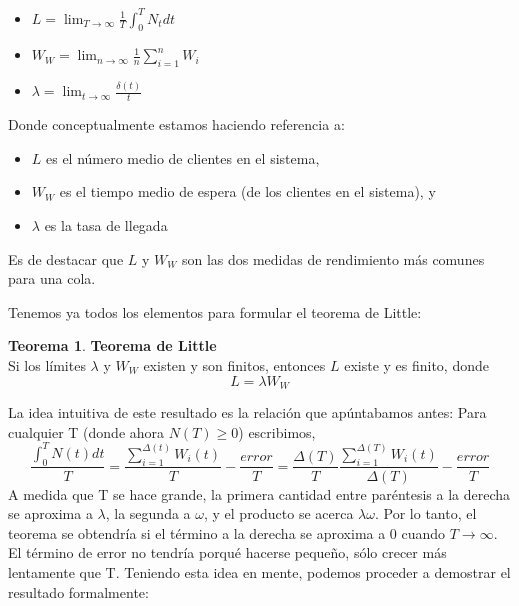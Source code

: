 \documentclass[a4paper,10pt]{scrartcl}
\theoremstyle{definition}
\newtheorem*{theorem*}{Teorema}
\numberwithin{equation}{section}
\begin{document}
\begin{itemize}
 \item $L = \lim_{T\to \infty}\frac{1}{T} \int_{0}^{T} N_t dt$
 \item $W_W = \lim_{n\to \infty}\frac{1}{n} \sum_{i=1}^{n} W_i$
 \item $\lambda = \lim_{t\to \infty}\frac{\delta(t)}{t}$
\end{itemize}

Donde conceptualmente estamos haciendo referencia a:
\begin{itemize}
 \item $L$ es el número medio de clientes en el sistema,
 \item $W_W$ es el tiempo medio de espera (de los clientes en el sistema), y
 \item $\lambda$ es la tasa de llegada 
\end{itemize}
Es de destacar que  $L$ y $W_W$ son las dos medidas de rendimiento más comunes para una cola.


Tenemos ya todos los elementos para formular el teorema de Little:
\begin{theorem*}{\bf{Teorema de Little}}\\
Si los límites $\lambda$ y $W_W$ existen y son finitos, entonces $L$ existe y es finito, donde 
\[L = \lambda W_W\]
\end{theorem*}

La idea intuitiva de este resultado es la relación que apúntabamos antes: Para cualquier T (donde ahora $N (T) \geq 0$) escribimos,
\[ \frac{\int_{0}^{T} N(t)dt}{T}=\frac{\sum_{i=1}^{\Delta (t)} W_i(t)}{T}-\frac{error}{T}=\frac{\Delta(T)}{T}\frac{\sum_{i=1}^{\Delta (T)} W_i(t)}{\Delta(T)}-\frac{error}{T}   \]
A medida que T se hace grande, la primera cantidad entre paréntesis a la derecha se aproxima a $\lambda$, la segunda a $\omega$, y el producto se acerca $\lambda\omega$. Por lo tanto, el teorema se obtendría si el término a la derecha se aproxima a 0 cuando $T\rightarrow\infty$. El término de error no tendría porqué hacerse pequeño, sólo crecer más lentamente que T.
Teniendo esta idea en mente, podemos proceder a demostrar el resultado formalmente:
\end{document}
